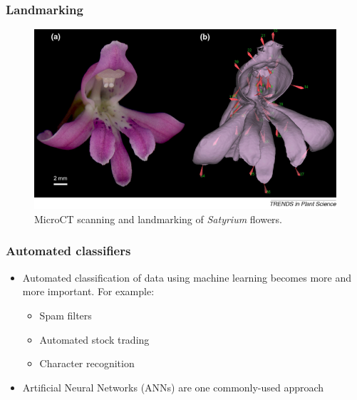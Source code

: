 \documentclass[]{beamer}
\begin{document}
    \begin{frame}[plain]
        \frametitle{Landmarking}

        \begin{figure}[!htb]
              \includegraphics[width=\linewidth]{Timotheus_2010_MicroCT_landmarks}
              \caption*{MicroCT scanning and landmarking of \textit{Satyrium} flowers.\footnotemark}
            \endminipage\hfill
        \end{figure}

    \end{frame}


	\begin{frame}
		\frametitle{Automated classifiers}
		\begin{itemize}
			\item Automated classification of data using machine learning becomes more and
			more important. For example:
			\begin{itemize}
				\item Spam filters
				\item Automated stock trading
				\item Character recognition
			\end{itemize}
			\item Artificial Neural Networks (ANNs) are one commonly-used approach
		\end{itemize}
	\end{frame}
\end{document}
